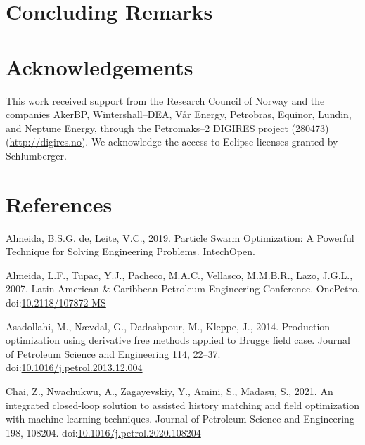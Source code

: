 \documentclass[]{elsarticle} %
\newlength{\cslhangindent}
\newenvironment{CSLReferences}[2] %
 {%
  \setlength{\parindent}{0pt}
  \ifodd #1 \everypar{\setlength{\hangindent}{\cslhangindent}}\ignorespaces\fi
  \ifnum #2 > 0
  \setlength{\parskip}{#2\baselineskip}
  \fi
 }%
 {}
\begin{document}
\begin{eqution}
\newpage

\hypertarget{concluding-remarks}{%
\section{Concluding Remarks}\label{concluding-remarks}}

\newpage

\hypertarget{acknowledgements}{%
\section{Acknowledgements}\label{acknowledgements}}

This work received support from the Research Council of Norway and the companies AkerBP, Wintershall--DEA, Vår Energy, Petrobras, Equinor, Lundin, and Neptune Energy, through the Petromaks--2 DIGIRES project (280473) (\url{http://digires.no}). We acknowledge the access to Eclipse licenses granted by Schlumberger.

\newpage

\hypertarget{references}{%
\section*{References}\label{references}}

\hypertarget{refs}{}
\begin{CSLReferences}{1}{0}
\leavevmode{}%
Almeida, B.S.G. de, Leite, V.C., 2019. Particle Swarm Optimization: A Powerful Technique for Solving Engineering Problems. IntechOpen.

\leavevmode{}%
Almeida, L.F., Tupac, Y.J., Pacheco, M.A.C., Vellasco, M.M.B.R., Lazo, J.G.L., 2007. Latin American \& Caribbean Petroleum Engineering Conference. OnePetro. doi:\href{https://doi.org/10.2118/107872-MS}{10.2118/107872-MS}

\leavevmode{}%
Asadollahi, M., Nævdal, G., Dadashpour, M., Kleppe, J., 2014. Production optimization using derivative free methods applied to Brugge field case. Journal of Petroleum Science and Engineering 114, 22--37. doi:\href{https://doi.org/10.1016/j.petrol.2013.12.004}{10.1016/j.petrol.2013.12.004}

\leavevmode{}%
Chai, Z., Nwachukwu, A., Zagayevskiy, Y., Amini, S., Madasu, S., 2021. An integrated closed-loop solution to assisted history matching and field optimization with machine learning techniques. Journal of Petroleum Science and Engineering 198, 108204. doi:\href{https://doi.org/10.1016/j.petrol.2020.108204}{10.1016/j.petrol.2020.108204}


\end{CSLReferences}
\end{eqution}
\end{document}
